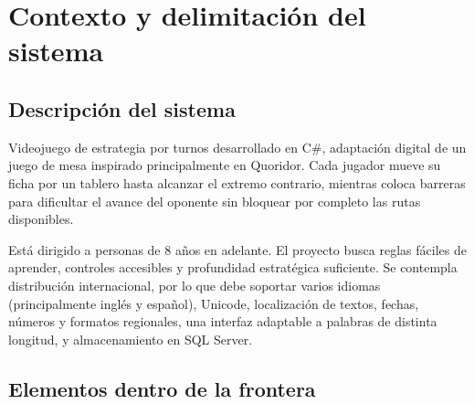 \section{Contexto y delimitación del sistema}\label{sec:contexto}

\subsection{Descripción del sistema}

Videojuego de estrategia por turnos desarrollado en C\#, adaptación digital de un juego de mesa inspirado principalmente en Quoridor. Cada jugador mueve su ficha por un tablero hasta alcanzar el extremo contrario, mientras coloca barreras para dificultar el avance del oponente sin bloquear por completo las rutas disponibles.

Está dirigido a personas de 8 años en adelante. El proyecto busca reglas fáciles de aprender, controles accesibles y profundidad estratégica suficiente. Se contempla distribución internacional, por lo que debe soportar varios idiomas (principalmente inglés y español), Unicode, localización de textos, fechas, números y formatos regionales, una interfaz adaptable a palabras de distinta longitud, y almacenamiento en SQL Server.

\begin{center}
  
\end{center}

\subsection{Elementos dentro de la frontera}

